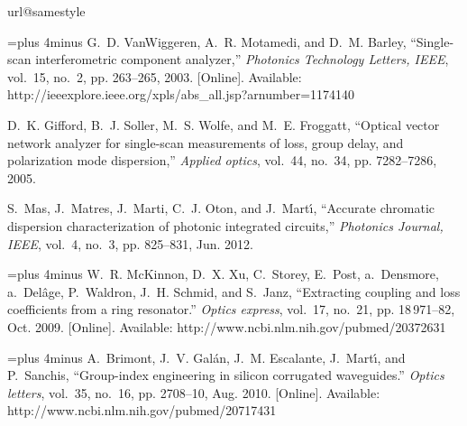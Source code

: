 \documentclass[journal]{IEEEtran}
\begin{document}
\begin{thebibliography}{10}
\providecommand{\url}[1]{#1}
\csname url@samestyle\endcsname
\providecommand{\newblock}{\relax}
\providecommand{\bibinfo}[2]{#2}
\providecommand{\BIBentrySTDinterwordspacing}{\spaceskip=0pt\relax}
\providecommand{\BIBentryALTinterwordstretchfactor}{4}
\providecommand{\BIBentryALTinterwordspacing}{\spaceskip=\fontdimen2\font plus
\BIBentryALTinterwordstretchfactor\fontdimen3\font minus
  \fontdimen4\font\relax}
\providecommand{\BIBforeignlanguage}[2]{{%
\expandafter\ifx\csname l@#1\endcsname\relax
\typeout{** WARNING: IEEEtran.bst: No hyphenation pattern has been}%
\typeout{** loaded for the language `#1'. Using the pattern for}%
\typeout{** the default language instead.}%
\else
\language=\csname l@#1\endcsname
\fi
#2}}
\providecommand{\BIBdecl}{\relax}
\BIBdecl

\BIBentryALTinterwordspacing
G.~D. VanWiggeren, A.~R. Motamedi, and D.~M. Barley, ``{Single-scan
  interferometric component analyzer},'' \emph{Photonics Technology Letters,
  IEEE}, vol.~15, no.~2, pp. 263--265, 2003. [Online]. Available:
  \url{http://ieeexplore.ieee.org/xpls/abs\_all.jsp?arnumber=1174140}
\BIBentrySTDinterwordspacing

D.~K. Gifford, B.~J. Soller, M.~S. Wolfe, and M.~E. Froggatt, ``{Optical vector
  network analyzer for single-scan measurements of loss, group delay, and
  polarization mode dispersion},'' \emph{Applied optics}, vol.~44, no.~34, pp.
  7282--7286, 2005.

S.~Mas, J.~Matres, J.~Marti, C.~J. Oton, and J.~Mart\'{\i}, ``{Accurate
  chromatic dispersion characterization of photonic integrated circuits},''
  \emph{Photonics Journal, IEEE}, vol.~4, no.~3, pp. 825--831, Jun. 2012.

\BIBentryALTinterwordspacing
W.~R. McKinnon, D.~X. Xu, C.~Storey, E.~Post, a.~Densmore, a.~Del\^{a}ge,
  P.~Waldron, J.~H. Schmid, and S.~Janz, ``{Extracting coupling and loss
  coefficients from a ring resonator.}'' \emph{Optics express}, vol.~17,
  no.~21, pp. 18\,971--82, Oct. 2009. [Online]. Available:
  \url{http://www.ncbi.nlm.nih.gov/pubmed/20372631}
\BIBentrySTDinterwordspacing

\BIBentryALTinterwordspacing
A.~Brimont, J.~V. Gal\'{a}n, J.~M. Escalante, J.~Mart\'{\i}, and P.~Sanchis,
  ``{Group-index engineering in silicon corrugated waveguides.}'' \emph{Optics
  letters}, vol.~35, no.~16, pp. 2708--10, Aug. 2010. [Online]. Available:
  \url{http://www.ncbi.nlm.nih.gov/pubmed/20717431}
\BIBentrySTDinterwordspacing


\end{thebibliography}
\end{document}
